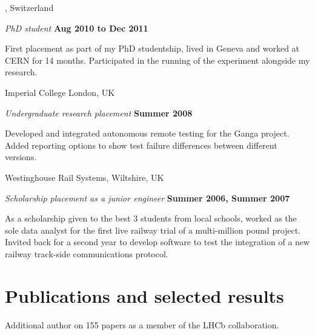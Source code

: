 \documentclass[10pt]{article}
\renewenvironment{compactitem}{
  \begin{list}{}{
    \setlength{\leftmargin}{1.5em}
  }
}{
  \end{list}
}
\def\icl{Imperial College London}
\begin{document}
\cern, Switzerland
\begin{compactitem}
\item \textit{PhD student}%
        \hfill \textbf{Aug 2010 to Dec 2011}
\begin{compactitem}
\item First placement as part of my PhD studentship, lived in Geneva and worked at CERN for 14 months.
Participated in the running of the \lhcb experiment alongside my research.
\end{compactitem}
\end{compactitem}

\icl, UK
\begin{compactitem}
\item \textit{Undergraduate research placement}%
        \hfill \textbf{Summer 2008}
\begin{compactitem}
\item Developed and integrated autonomous remote testing for the Ganga project.  
Added reporting options to show test failure differences between different versions.
\end{compactitem}
\end{compactitem}

Westinghouse Rail Systems, Wiltshire, UK
\begin{compactitem}
\item \textit{Scholarship placement as a junior engineer}%
        \hfill \textbf{Summer 2006, Summer 2007}
\begin{compactitem}
\item As a scholarship given to the best 3 students from local schools, worked as the sole data analyst for the first live railway trial of a multi-million pound project. 
Invited back for a second year to develop software to test the integration of a new railway track-side communications protocol. 
\end{compactitem}
\end{compactitem}


\section*{Publications and selected results} 
\begin{compactitem}
\item {}
\item {}
\item {}
\item {}
\item {}
\item Additional author on 155 papers as a member of the LHCb collaboration.
\end{compactitem}	
\end{document}
